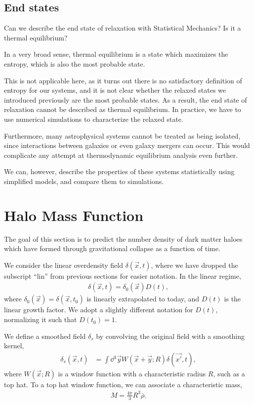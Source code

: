 \subsection{End states}

Can we describe the end state of relaxation with Statistical Mechanics?
Is it a thermal equilibrium?

In a very broad sense, thermal equilibrium is a state which maximizes the entropy, which is also the most probable state.

This is not applicable here, as it turns out there is no satisfactory definition of entropy for our systems,
and it is not clear whether the relaxed states we introduced previously are the most probable states.
As a result, the end state of relaxation cannot be described as thermal equilibrium.
In practice, we have to use numerical simulations to characterize the relaxed state.

Furthermore, many astrophysical systems cannot be treated as being isolated, since interactions between galaxies or even galaxy mergers can occur.
This would complicate any attempt at thermodynamic equilibrium analysis even further.

We can, however, describe the properties of these systems statistically using simplified models, and compare them to simulations.


\section{Halo Mass Function}

The goal of this section is to predict the number density of dark matter haloes which have formed through gravitational collapse as a function of time.

We consider the linear overdensity field $\delta(\vec{x}, t)$, where we have dropped the subscript \enquote{$\text{lin}$} from previous sections for easier notation.
In the linear regime, 
\begin{align*}
	\delta(\vec{x},t) = \delta_0(\vec{x}) D(t),
\end{align*}
where $\delta_0(\vec{x}) = \delta(\vec{x}, t_0)$ is linearly extrapolated to today, and $D(t)$ is the linear growth factor.
We adopt a slightly different notation for $D(t)$, normalizing it such that $D(t_0) = 1$.

We define a smoothed field $\delta_s$ by convolving the original field with a smoothing kernel,
\begin{align*}
	\delta_s(\vec{x}, t)
	&= \int \dd{^3 \vec{y}} W(\vec{x}+\vec{y}; R) \delta(\vec{x'}, t),
\end{align*}
where $W(\vec{x}; R)$ is a window function with a characteristic radius $R$, such as a top hat.
To a top hat window function, we can associate a characteristic mass,
\begin{align*}
	M = \frac{4\pi}{3} R^3 \bar{\rho}.
\end{align*}

